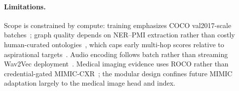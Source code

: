 \paragraph{Limitations.}
Scope is constrained by compute: training emphasizes COCO val2017-scale batches~\cite{lin2014microsoft}; graph quality depends on NER--PMI extraction rather than costly human-curated ontologies~\cite{pan2024unifying}, which caps early multi-hop scores relative to aspirational targets~\cite{sarmah2024hybridrag}. Audio encoding follows batch rather than streaming Wav2Vec deployment~\cite{baevski2020wav2vec}. Medical imaging evidence uses ROCO rather than credential-gated MIMIC-CXR~\cite{johnson2019mimic}; the modular design confines future MIMIC adaptation largely to the medical image head and index.

\endgroup

